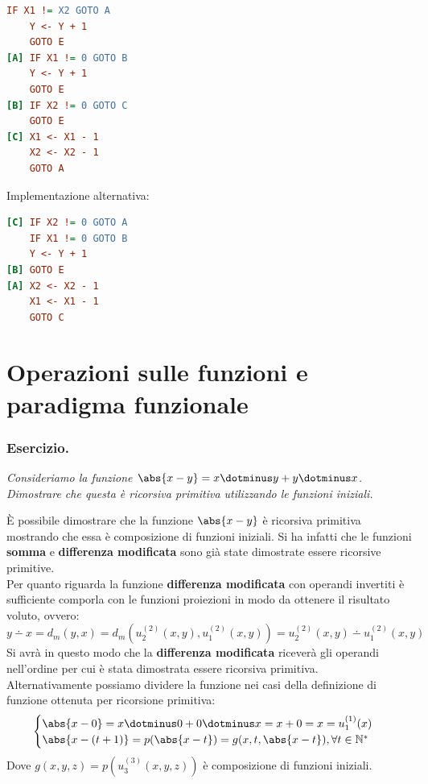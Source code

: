 \begin{lstlisting}[language=ini, label={Predicato Minore Uguale},  caption=Predicato Minore Uguale]
    IF X1 != X2 GOTO A
    Y <- Y + 1
    GOTO E
[A] IF X1 != 0 GOTO B
    Y <- Y + 1
    GOTO E
[B] IF X2 != 0 GOTO C
    GOTO E
[C] X1 <- X1 - 1
    X2 <- X2 - 1
    GOTO A
\end{lstlisting}

Implementazione alternativa:

\begin{lstlisting}[language=ini, label={Predicato Minore Uguale AltVer},  caption=Predicato Minore Uguale]
[C] IF X2 != 0 GOTO A
    IF X1 != 0 GOTO B
    Y <- Y + 1
[B] GOTO E
[A] X2 <- X2 - 1
    X1 <- X1 - 1
    GOTO C
\end{lstlisting}

\section{Operazioni sulle funzioni e paradigma funzionale}

\subsubsection*{Esercizio.} \textit{Consideriamo la funzione \(\abs{x-y}=x \dotminus y + y \dotminus x\). Dimostrare che questa è ricorsiva primitiva utilizzando le funzioni iniziali.}

È possibile dimostrare che la funzione \(\abs{x-y}\) è ricorsiva primitiva mostrando che essa è composizione di funzioni iniziali. Si ha infatti che le funzioni \textbf{somma} e \textbf{differenza modificata} sono già state dimostrate essere ricorsive primitive. \\
Per quanto riguarda la funzione \textbf{differenza modificata} con operandi invertiti è sufficiente comporla con le funzioni proiezioni in modo da ottenere il risultato voluto, ovvero:
\begin{equation}
    y\dotminus x = d_m(y,x) = d_m(u_2^{(2)}(x,y),u_1^{(2)}(x,y)) = u_2^{(2)}(x,y) \dotminus u_1^{(2)}(x,y)
\end{equation}
Si avrà in questo modo che la \textbf{differenza modificata} riceverà gli operandi nell'ordine per cui è stata dimostrata essere ricorsiva primitiva. \\
Alternativamente possiamo dividere la funzione nei casi della definizione di funzione ottenuta per ricorsione primitiva:
\begin{equation}
    \begin{cases}
        \abs{x-0}=x \dotminus 0 + 0 \dotminus x = x + 0 = x = u_1^{(1)}(x)\\
        \abs{x-(t+1)}= p(\abs{x-t})=g(x,t,\abs{x-t}), \forall t \in \mathbb{N}^*
    \end{cases}
    \label{Funzione Sottrazione Valore Assoluto Eq}
\end{equation}
Dove \(g(x,y,z)=p(u_3^{(3)}(x,y,z))\) è composizione di funzioni iniziali.

